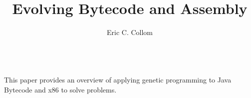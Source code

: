 \documentclass{sig-alternate}
\begin{document}
%

\title{Evolving Bytecode and Assembly}
%
%
%
%
%
%
\author{
%
%
\alignauthor
Eric C. Collom \\
 \\
}

\maketitle
\begin{abstract}

\end{abstract}
This paper provides an overview of applying genetic programming to Java Bytecode and x86 to solve problems.
\end{document}
